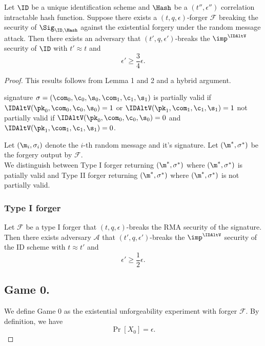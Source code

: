 \begin{theorem}
Let  $\ID$ be a unique identification scheme and $\Hash$ be a $(t'',\epsilon'')$ correlation intractable hash function. Suppose there exists a $(t,q,\epsilon)$-forger $\mathcal{F}$ breaking the security of $\Sig_{\ID,\Hash}$ against the existential forgery under the random message attack. Then there exists an adversary that $(t',q,\epsilon')$-breaks the $\imp^{\IDAltV}$ security of $\ID$ with $t' \approx t$ and
$$ \epsilon' \geq \frac{3}{4}\epsilon .$$
\end{theorem}
\begin{proof}
This results follows from Lemma 1 and 2 and a hybrid argument.

\begin{definition}
signature  $\sigma = (\com_{0},\c_{0},\s_{0}, \com_{1}, \c_{1},\s_{1})$ is
partially valid if $\IDAltV(\pk_0,\com_0,\c_0,\s_0) =1$ or $\IDAltV(\pk_1,\com_1,\c_1,\s_1) = 1$
not partially valid if 
 $\IDAltV(\pk_0,\com_0,\c_0,\s_0) =0$ and $\IDAltV(\pk_1,\com_1,\c_1,\s_1) =0$.

\end{definition}

Let $(\m_i,\sigma_i)$ denote the $i$-th random message and it's signature. Let $(\m^*,\sigma^*)$ be the forgery output by $\mathcal{F}$.
\\
We distinguish between Type I forger returning $(\m^*, \sigma^*)$ where $(\m^*, \sigma^*)$ is patially valid  and Type II forger returning  $(\m^*, \sigma^*)$ where $(\m^*, \sigma^*)$ is not partially valid.
\subsubsection{Type I forger} 
\begin{lemma}
Let $\mathcal{F}$ be a type I forger that $(t,q,\epsilon)$-breaks the RMA security of the signature. Then there exists adversary $\mathcal{A}$ that $(t',q,\epsilon')$-breaks the $\imp^{\IDAltV}$ security of the ID scheme with 
$t \approx t'$ and 
$$\epsilon' \geq \frac{1}{2} \epsilon.$$
\end{lemma}

\subsection*{Game 0.}
We define Game 0 as the existential unforgeability experiment with forger $\mathcal{F}$. By definition, we have
$$\Pr[X_0] = \epsilon.$$


\end{proof}
